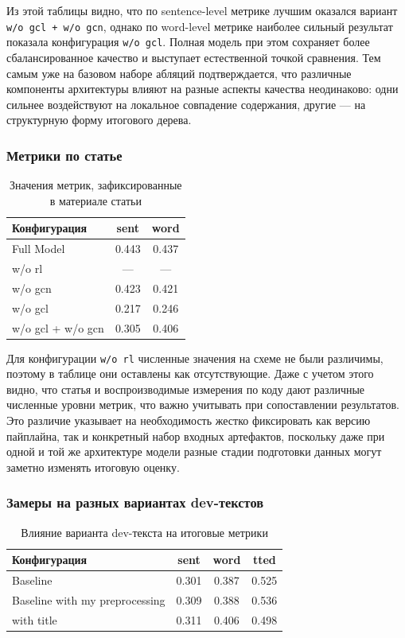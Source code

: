 \documentclass[12pt,a4paper]{article}
\begin{document}
Из этой таблицы видно, что по sentence-level метрике лучшим оказался вариант
\texttt{w/o gcl + w/o gcn}, однако по word-level метрике наиболее сильный результат
показала конфигурация \texttt{w/o gcl}. Полная модель при этом сохраняет более
сбалансированное качество и выступает естественной точкой сравнения. Тем самым уже
на базовом наборе абляций подтверждается, что различные компоненты архитектуры
влияют на разные аспекты качества неодинаково: одни сильнее воздействуют на
локальное совпадение содержания, другие --- на структурную форму итогового дерева.

\subsubsection{Метрики по статье}

\begin{table}[H]
\centering
\caption{Значения метрик, зафиксированные в материале статьи}
\begin{tabular}{lcc}
\toprule
Конфигурация & sent & word \\
\midrule
Full Model & 0.443 & 0.437 \\
w/o rl & --- & --- \\
w/o gcn & 0.423 & 0.421 \\
w/o gcl & 0.217 & 0.246 \\
w/o gcl + w/o gcn & 0.305 & 0.406 \\
\bottomrule
\end{tabular}
\end{table}

Для конфигурации \texttt{w/o rl} численные значения на схеме не были различимы, поэтому в
таблице они оставлены как отсутствующие. Даже с учетом этого видно, что статья и
воспроизводимые измерения по коду дают различные численные уровни метрик, что важно
учитывать при сопоставлении результатов. Это различие указывает на необходимость
жестко фиксировать как версию пайплайна, так и конкретный набор входных артефактов,
поскольку даже при одной и той же архитектуре модели разные стадии подготовки данных
могут заметно изменять итоговую оценку.

\subsubsection{Замеры на разных вариантах dev-текстов}

\begin{table}[H]
\centering
\caption{Влияние варианта dev-текста на итоговые метрики}
\begin{tabular}{lccc}
\toprule
Конфигурация & sent & word & tted \\
\midrule
Baseline & 0.301 & 0.387 & 0.525 \\
Baseline with my preprocessing & 0.309 & 0.388 & 0.536 \\
with title & 0.311 & 0.406 & 0.498 \\
\bottomrule
\end{tabular}
\end{table}
\end{document}
